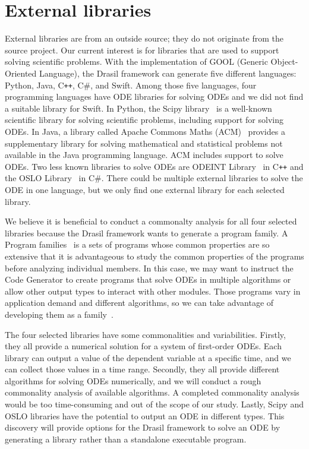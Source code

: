\chapter{External libraries}
\label{cha_extlib}
External libraries are from an outside source; they do not originate from the source project. Our current interest is for libraries that are used to support solving scientific problems. With the implementation of GOOL (Generic Object-Oriented Language), the Drasil framework can generate five different languages: Python, Java, C\texttt{++}, C\#, and Swift. Among those five languages, four programming languages have ODE libraries for solving ODEs and we did not find a suitable library for Swift. In Python, the Scipy library~\citep{scipy} is a well-known scientific library for solving scientific problems, including support for solving ODEs. In Java, a library called Apache Commons Maths (ACM)~\citep{apache} provides a supplementary library for solving mathematical and statistical problems not available in the Java programming language. ACM includes support to solve ODEs. Two less known libraries to solve ODEs are ODEINT Library~\citep{odeint} in C\texttt{++} and the OSLO Library~\citep{oslo} in C\#. There could be multiple external libraries to solve the ODE in one language, but we only find one external library for each selected library. 

We believe it is beneficial to conduct a commonalty analysis for all four selected libraries because the Drasil framework wants to generate a program family. A Program families~\citep{dp1976} is a sets of programs whose common properties are so extensive that it is advantageous to study the common properties of the programs before analyzing individual members. In this case, we may want to instruct the Code Generator to create programs that solve ODEs in multiple algorithms or allow other output types to interact with other modules. Those programs vary in application demand and different algorithms, so we can take advantage of developing them as a family~\citep{ss2004}.

The four selected libraries have some commonalities and variabilities. Firstly, they all provide a numerical solution for a system of first-order ODEs. Each library can output a value of the dependent variable at a specific time, and we can collect those values in a time range. Secondly, they all provide different algorithms for solving ODEs numerically, and we will conduct a rough commonality analysis of available algorithms. A completed commonality analysis would be too time-consuming and out of the scope of our study. Lastly, Scipy and OSLO libraries have the potential to output an ODE in different types. This discovery will provide options for the Drasil framework to solve an ODE by generating a library rather than a standalone executable program. 

